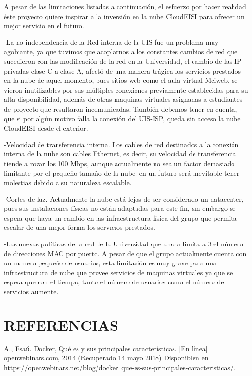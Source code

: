     A pesar de las limitaciones listadas  a continuación, el esfuerzo por hacer realidad éste proyecto quiere inspirar a la inversión en la nube CloudEISI para ofrecer un mejor servicio en el futuro.
    
    -La no independencia de la Red interna de la UIS fue un problema muy agobiante,  ya que tuvimos que acoplarnos a los constantes cambios de red que sucedieron con las modificación de la red en la Universidad, el cambio de  las IP privadas clase C  a clase A, afectó de una manera trágica los servicios prestados en la nube de aquel momento, pues sitios web como el aula virtual Meiweb, se vieron inutilizables por sus múltiples conexiones previamente establecidas para su alta disponibilidad, además de otras maquinas virtuales asignadas a estudiantes de proyecto que resultaron incomunicadas. También debemos tener en cuenta, que si por algún motivo falla la conexión del UIS-ISP, queda sin acceso la nube CloudEISI desde el exterior.
    
    -Velocidad de transferencia interna. Los cables de red destinados a la conexión interna de la nube son cables Ethernet, es decir, su velocidad de transferencia tiende a rozar los 100 Mbps, aunque actualmente no sea un factor demasiado limitante por el pequeño tamaño de la nube, en un futuro será inevitable tener molestias debido a su naturaleza escalable.
    
    -Cortes de luz. Actualmente la nube está lejos de ser considerado un datacenter, pues sus instalaciones físicas no están adaptadas para este fin, sin embargo se espera que haya un cambio en las infraestructura física del grupo que permita escalar de una mejor forma los servicios prestados.
    
    -Las nuevas políticas de la red de la Universidad que ahora limita a 3 el número de direcciones MAC por puerto. A pesar de que el grupo actualmente cuenta con un numero pequeño de usuarios, esta limitación es muy grave para una infraestructura de nube que provee servicios de maquinas virtuales ya que se espera que con el tiempo, tanto el número de usuarios como el número de servicios aumente.
    
    \newpage\chapter{REFERENCIAS}
    
    A., Esaú. Docker, Qué es y sus principales características. [En línea] openwebinars.com, 2014 (Recuperado 14 mayo 2018) Disponiblen en https://openwebinars.net/blog/docker\ que-es-sus-principales-caracteristicas/.
    
